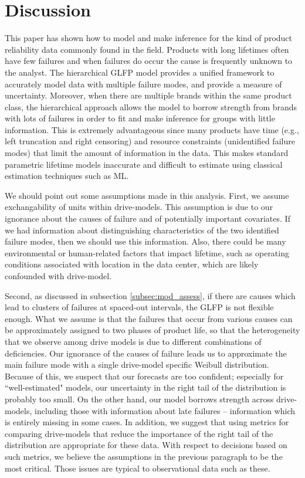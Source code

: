 \documentclass[12pt]{article}
\begin{document}
\section{Discussion}
\label{sec:Discussion}
This paper has shown how to model and make inference for the kind of product reliability data commonly found in the field.  Products with long lifetimes often have few failures and when failures do occur the cause is frequently unknown to the analyst.  The hierarchical GLFP model provides a unified framework to accurately model data with multiple failure modes, and provide a measure of uncertainty.  Moreover, when there are multiple brands within the same product class, the hierarchical approach allows the model to borrow strength from brands with lots of failures in order to fit and make inference for groups with little information.  This is extremely advantageous since many products have time (e.g., left truncation and right censoring) and resource constraints (unidentified failure modes) that limit the amount of information in the data.  This makes standard parametric lifetime models inaccurate and difficult to estimate using classical estimation techniques such as ML.  
  
We should point out some assumptions made in this analysis. First, we assume exchangability of units within drive-models. This assumption is due to our ignorance about the causes of failure and of potentially important covariates. If we had information about distinguishing characteristics of the two identified failure modes, then we should use this information. Also, there could be many environmental or human-related factors that impact lifetime, such as operating conditions associated with location in the data center, which are likely confounded with drive-model.

Second, as discussed in subsection \ref{subsec:mod_assess}, if there are causes which lead to clusters of failures at spaced-out intervals, the GLFP is not flexible enough. What we assume is that the failures that occur from various causes can be approximately assigned to two phases of product life, so that the heterogeneity that we observe among drive models is due to different combinations of deficiencies. Our ignorance of the causes of failure leads us to approximate the main failure mode with a single drive-model specific Weibull distribution. Because of this, we suspect that our forecasts are too confident; especially for ``well-estimated" models, our uncertainty in the right tail of the distribution is probably too small. On the other hand, our model borrows strength across drive-models, including those with information about late failures -- information which is entirely missing in some cases. In addition, we suggest that using metrics for comparing drive-models that reduce the importance of the right tail of the distribution are appropriate for these data. With respect to decisions based on such metrics, we believe the assumptions in the previous paragraph to be the most critical. Those issues are typical to observational data such as these.
\end{document}
